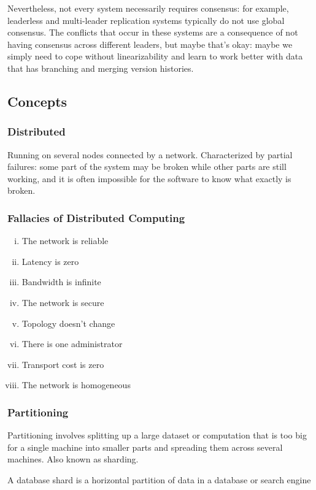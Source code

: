 \documentclass{article}
\begin{document}
    Nevertheless, not every system necessarily requires consensus: for example, leaderless and multi-leader replication systems typically do not use global consensus. The conflicts that occur in these systems are a consequence of not having consensus across different leaders, but maybe that’s okay: maybe we simply need to cope without linearizability and learn to work better with data that has branching and merging version histories.

    \subsection{Concepts}
    \subsubsection{Distributed}
    Running on several nodes connected by a network. Characterized by partial failures: some part of the system may be broken  while other parts are still working, and it is often impossible for the software to know what exactly is broken.
    
    \subsubsection{Fallacies of Distributed Computing}
    \begin{enumerate}[i.]
        \item The network is reliable
        \item Latency is zero
        \item Bandwidth is infinite
        \item The network is secure
        \item Topology doesn't change
        \item There is one administrator
        \item Transport cost is zero
        \item The network is homogeneous
    \end{enumerate}
    
    \subsubsection{Partitioning}
    Partitioning involves splitting up a large dataset or computation that is too big for a single machine into smaller parts and spreading them across several machines. Also known as sharding.
    
    A database shard is a horizontal partition of data in a database or search engine 
    
\end{document}
